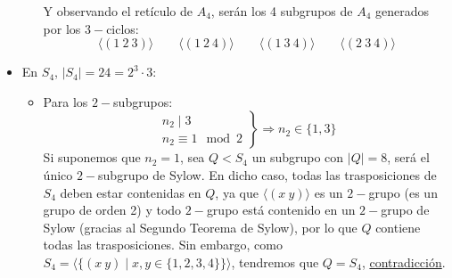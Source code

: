 \begin{ejemplo}
\begin{itemize}
\begin{itemize}
\begin{equation*}
                            \end{equation*}
                            Y observando el retículo de $A_4$, serán los 4 subgrupos de $A_4$ generados por los $3-$ciclos:
                            \begin{equation*}
                                \langle (1\ 2\ 3) \rangle  \qquad \langle (1\ 2\ 4) \rangle  \qquad \langle (1\ 3\ 4) \rangle  \qquad \langle (2\ 3\ 4) \rangle 
                            \end{equation*}
                    \end{itemize}
                \item En $S_4$, $|S_4| = 24 = 2^3 \cdot 3$:
                    \begin{itemize}
                        \item Para los $2-$subgrupos:
                            \begin{equation*}
                                \left.\begin{array}{r}
                                    n_2 \mid 3 \\
                                    n_2 \equiv 1 \mod 2
                                \end{array}\right\} \Longrightarrow n_2 \in \{1,3\}
                            \end{equation*}
                            Si suponemos que $n_2 = 1$, sea $Q<S_4$ un subgrupo con $|Q| = 8$, será el único $2-$subgrupo de Sylow. En dicho caso, todas las trasposiciones de $S_4$ deben estar contenidas en $Q$, ya que $\langle (x\ y) \rangle $ es un $2-$grupo (es un grupo de orden 2) y todo $2-$grupo está contenido en un $2-$grupo de Sylow (gracias al Segundo Teorema de Sylow), por lo que $Q$ contiene todas las trasposiciones. Sin embargo, como $S_4 = \langle \{(x\ y) \mid x,y \in \{1,2,3,4\}\} \rangle $, tendremos que $Q = S_4$, \underline{contradicción}.


\end{itemize}
\end{itemize}
\end{ejemplo}
